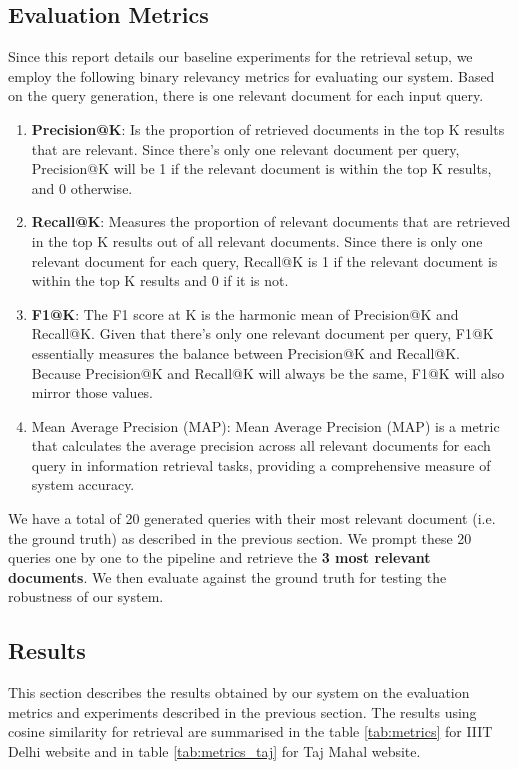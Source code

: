 \documentclass[sigconf,natbib=true,anonymous=false]{acmart}
\begin{document}
\subsection{Evaluation Metrics}
Since this report details our baseline experiments for the retrieval setup, we employ the following binary relevancy metrics for evaluating our system. Based on the query generation, there is one relevant document for each input query. 
\begin{enumerate}
    \item \textbf{Precision@K}: Is the proportion of retrieved documents in the top K results that are relevant. Since there's only one relevant document per query, Precision@K will be 1 if the relevant document is within the top K results, and 0 otherwise.
    \item \textbf{Recall@K}: Measures the proportion of relevant documents that are retrieved in the top K results out of all relevant documents. Since there is only one relevant document for each query, Recall@K is 1 if the relevant document is within the top K results and 0 if it is not.
    \item \textbf{F1@K}: The F1 score at K is the harmonic mean of Precision@K and Recall@K. Given that there's only one relevant document per query, F1@K essentially measures the balance between Precision@K and Recall@K. Because Precision@K and Recall@K will always be the same, F1@K will also mirror those values.
    \item Mean Average Precision (MAP): Mean Average Precision (MAP) is a metric that calculates the average precision across all relevant documents for each query in information retrieval tasks, providing a comprehensive measure of system accuracy.
\end{enumerate}

We have a total of 20 generated queries with their most relevant document (i.e. the ground truth) as described in the previous section. We prompt these 20 queries one by one to the pipeline and retrieve the \textbf{3 most relevant documents}. We then evaluate against the ground truth for testing the robustness of our system. 



\subsection{Results}

This section describes the results obtained by our system on the evaluation metrics and experiments described in the previous section. The results using cosine similarity for retrieval are summarised in the table \ref{tab:metrics} for IIIT Delhi website and in table \ref{tab:metrics_taj} for Taj Mahal website. 
\end{document}
